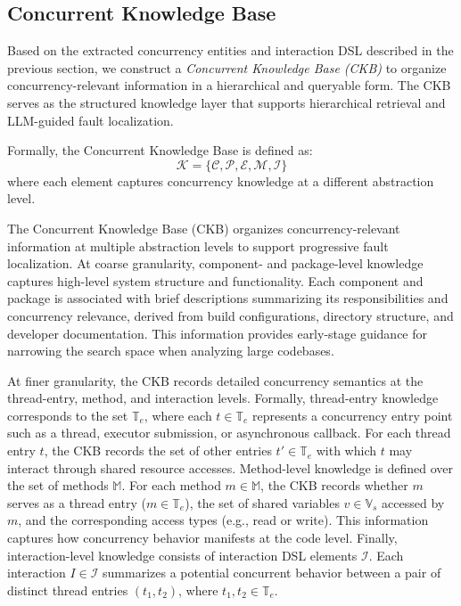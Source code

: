 \subsection{Concurrent Knowledge Base}
\label{sec:ckb}

Based on the extracted concurrency entities and interaction DSL described in the previous section, we construct a \emph{Concurrent Knowledge Base (CKB)} to organize concurrency-relevant information in a hierarchical and queryable form.
The CKB serves as the structured knowledge layer that supports hierarchical retrieval and LLM-guided fault localization.

Formally, the Concurrent Knowledge Base is defined as:
\[
\mathcal{K} = \{ \mathcal{C}, \mathcal{P}, \mathcal{E}, \mathcal{M}, \mathcal{I} \}
\]
where each element captures concurrency knowledge at a different abstraction level.

The Concurrent Knowledge Base (CKB) organizes concurrency-relevant information at multiple abstraction levels to support progressive fault localization.
At coarse granularity, component- and package-level knowledge captures high-level system structure and functionality.
Each component and package is associated with brief descriptions summarizing its responsibilities and concurrency relevance, derived from build configurations, directory structure, and developer documentation.
This information provides early-stage guidance for narrowing the search space when analyzing large codebases.

At finer granularity, the CKB records detailed concurrency semantics at the thread-entry, method, and interaction levels.
Formally, thread-entry knowledge corresponds to the set $\mathbb{T}_e$, where each $t \in \mathbb{T}_e$ represents a concurrency entry point such as a thread, executor submission, or asynchronous callback.
For each thread entry $t$, the CKB records the set of other entries $t' \in \mathbb{T}_e$ with which $t$ may interact through shared resource accesses.
Method-level knowledge is defined over the set of methods $\mathbb{M}$.
For each method $m \in \mathbb{M}$, the CKB records whether $m$ serves as a thread entry ($m \in \mathbb{T}_e$), the set of shared variables $v \in \mathbb{V}_s$ accessed by $m$, and the corresponding access types (e.g., read or write).
This information captures how concurrency behavior manifests at the code level.
Finally, interaction-level knowledge consists of interaction DSL elements $\mathcal{I}$.
Each interaction $I \in \mathcal{I}$ summarizes a potential concurrent behavior between a pair of distinct thread entries $(t_1, t_2)$, where $t_1, t_2 \in \mathbb{T}_e$.

